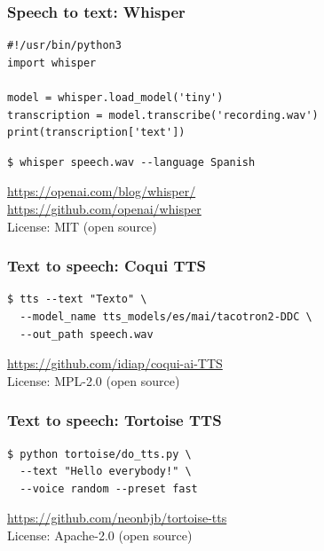 \documentclass[17pt,aspectratio=169,hyperref={pdfusetitle,colorlinks,allcolors=olive}]{beamer}
\begin{document}
\begin{frame}[fragile]
  \frametitle{Speech to text: Whisper}

{\small
\begin{verbatim}
#!/usr/bin/python3
import whisper

model = whisper.load_model('tiny')
transcription = model.transcribe('recording.wav')
print(transcription['text'])
\end{verbatim}
}

\begin{verbatim}
$ whisper speech.wav --language Spanish
\end{verbatim}

\begin{flushright}
  {\scriptsize
    \url{https://openai.com/blog/whisper/} \\
    \url{https://github.com/openai/whisper} \\
    License: MIT (open source) \\
  }
\end{flushright}

\end{frame}

\begin{frame}[fragile]
  \frametitle{Text to speech: Coqui TTS}

{\small
\begin{verbatim}
$ tts --text "Texto" \
  --model_name tts_models/es/mai/tacotron2-DDC \
  --out_path speech.wav
\end{verbatim}
}

  \begin{flushright}
    {\small
    \url{https://github.com/idiap/coqui-ai-TTS} \\
    License: MPL-2.0 (open source) \\
  }
  \end{flushright}

\end{frame}

\begin{frame}[fragile]
  \frametitle{Text to speech: Tortoise TTS}

{\small
\begin{verbatim}
$ python tortoise/do_tts.py \
  --text "Hello everybody!" \
  --voice random --preset fast
\end{verbatim}
}

  \begin{flushright}
    {\small
    \url{https://github.com/neonbjb/tortoise-tts} \\
    License: Apache-2.0 (open source) \\
  }
  \end{flushright}

\end{frame}
\end{document}
